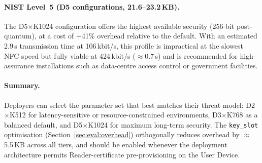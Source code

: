 \paragraph{NIST Level~5 (D5 configurations, 21.6–23.2\,KB).}
The D5$\times$K1024 configuration offers the highest available security (256-bit
post-quantum), at a cost of $+$41\% overhead relative to the default.  With
an estimated 2.9\,s transmission time at 106\,kbit/s, this profile is
impractical at the slowest NFC speed but fully viable at 424\,kbit/s
($\approx$0.7\,s) and is recommended for high-assurance installations such
as data-centre access control or government facilities.

\paragraph{Summary.}
Deployers can select the parameter set that best matches their threat
model: D2$\times$K512 for latency-sensitive or resource-constrained
environments, D3$\times$K768 as a balanced default, and D5$\times$K1024
for maximum long-term security.  The \texttt{key\_slot} optimisation
(Section~\ref{sec:eval:overhead}) orthogonally reduces overhead by
$\approx$5.5\,KB across all tiers, and should be enabled whenever the
deployment architecture permits Reader-certificate pre-provisioning on
the User Device.


